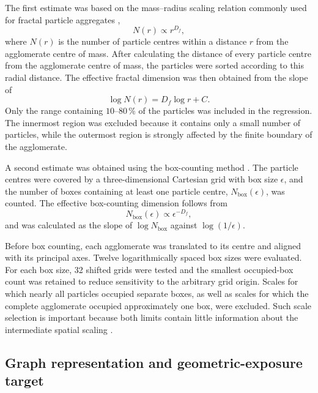 \documentclass[12pt,a4paper]{article}
\begin{document}
The first estimate was based on the mass--radius scaling relation commonly
used for fractal particle aggregates \cite{Sorensen2001,Bushell2002},
\begin{equation}
	N(r)\propto r^{D_f},
\end{equation}
where \(N(r)\) is the number of particle centres within a distance \(r\) from
the agglomerate centre of mass. After calculating the distance of every
particle centre from the agglomerate centre of mass, the particles were sorted
according to this radial distance. The effective fractal dimension was then
obtained from the slope of
\begin{equation}
	\log N(r)=D_f\log r+C.
\end{equation}
Only the range containing \(10\)--\(80\,\%\) of the particles was included in
the regression. The innermost region was excluded because it contains only a
small number of particles, while the outermost region is strongly affected by
the finite boundary of the agglomerate.

A second estimate was obtained using the box-counting method
\cite{Liebovitch1989,ForoutanPour1999,Theiler1990}. The particle centres were
covered by a three-dimensional Cartesian grid with box size \(\epsilon\), and
the number of boxes containing at least one particle centre,
\(N_{\mathrm{box}}(\epsilon)\), was counted. The effective box-counting
dimension follows from
\begin{equation}
	N_{\mathrm{box}}(\epsilon)
	\propto \epsilon^{-D_f},
\end{equation}
and was calculated as the slope of
\(\log N_{\mathrm{box}}\) against \(\log(1/\epsilon)\).

Before box counting, each agglomerate was translated to its centre and aligned
with its principal axes. Twelve logarithmically spaced box sizes were
evaluated. For each box size, 32 shifted grids were tested and the smallest
occupied-box count was retained to reduce sensitivity to the arbitrary grid
origin. Scales for which nearly all particles occupied separate boxes, as well
as scales for which the complete agglomerate occupied approximately one box,
were excluded. Such scale selection is important because both limits contain
little information about the intermediate spatial scaling
\cite{ForoutanPour1999,Theiler1990}.

\subsection{Graph representation and geometric-exposure target}
\end{document}
